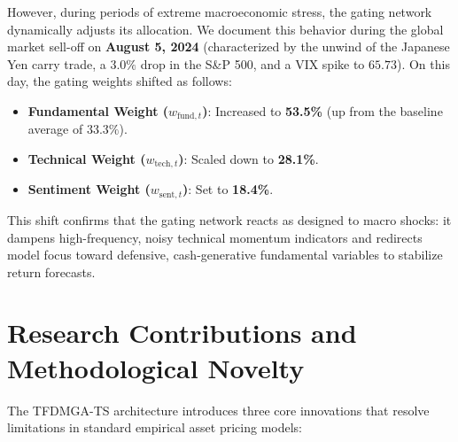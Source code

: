 \documentclass[11pt]{article}
\begin{document}
However, during periods of extreme macroeconomic stress, the gating network dynamically adjusts its allocation. We document this behavior during the global market sell-off on \textbf{August 5, 2024} (characterized by the unwind of the Japanese Yen carry trade, a $3.0\%$ drop in the S\&P 500, and a VIX spike to $65.73$). On this day, the gating weights shifted as follows:
\begin{itemize}
    \item \textbf{Fundamental Weight ($w_{\text{fund},t}$)}: Increased to \textbf{53.5\%} (up from the baseline average of $33.3\%$).
    \item \textbf{Technical Weight ($w_{\text{tech},t}$)}: Scaled down to \textbf{28.1\%}.
    \item \textbf{Sentiment Weight ($w_{\text{sent},t}$)}: Set to \textbf{18.4\%}.
\end{itemize}
This shift confirms that the gating network reacts as designed to macro shocks: it dampens high-frequency, noisy technical momentum indicators and redirects model focus toward defensive, cash-generative fundamental variables to stabilize return forecasts.

\section{Research Contributions and Methodological Novelty}
The TFDMGA-TS architecture introduces three core innovations that resolve limitations in standard empirical asset pricing models:
\end{document}
